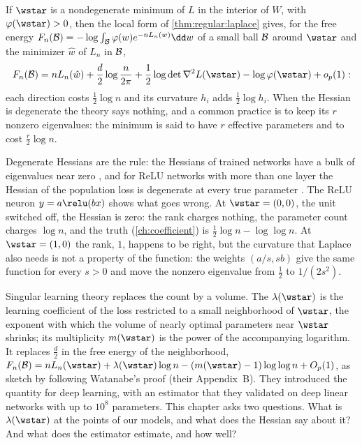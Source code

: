 \begin{refsection}
\begin{regularanswer}
If $\wstar$ is a nondegenerate minimum of $L$ in the interior of $W$, with $\varphi(\wstar)>0$, then the local form of \cref{thm:regular:laplace} gives, for the free energy $F_n(\llcB)=-\log\int_{\llcB}\varphi(w)e^{-nL_n(w)}\dd w$ of a small ball $\mathcal{B}$ around $\wstar$ and the minimizer $\hat w$ of $L_n$ in $\mathcal{B}$,
\[
F_n(\llcB)=nL_n(\hat w)+\frac d2\log\frac n{2\pi}+\frac12\log\det\nabla^2L(\wstar)-\log\varphi(\wstar)+o_p(1):
\]
each direction costs $\tfrac12\log n$ and its curvature $h_i$ adds $\tfrac12\log h_i$. When the Hessian is degenerate the theory says nothing, and a common practice is to keep its $r$ nonzero eigenvalues: the minimum is said to have $r$ effective parameters and to cost $\tfrac r2\log n$.
\end{regularanswer}

Degenerate Hessians are the rule: the Hessians of trained networks have a bulk of eigenvalues near zero \parencite{SagunEtAl2016}, and for ReLU networks with more than one layer the Hessian of the population loss is degenerate at every true parameter \parencite{WeiEtAl2023}. The ReLU neuron $y=a\relu(bx)$ shows what goes wrong. At $\wstar=(0,0)$, the unit switched off, the Hessian is zero: the rank charges nothing, the parameter count charges $\log n$, and the truth (\cref{ch:coefficient}) is $\tfrac12\log n-\log\log n$. At $\wstar=(1,0)$ the rank, $1$, happens to be right, but the curvature that Laplace also needs is not a property of the function: the weights $(a/s,sb)$ give the same function for every $s>0$ and move the nonzero eigenvalue from $\tfrac12$ to $1/(2s^2)$.

Singular learning theory replaces the count by a volume. The  $\lambda(\wstar)$ is the learning coefficient of the loss restricted to a small neighborhood of $\wstar$, the exponent with which the volume of nearly optimal parameters near $\wstar$ shrinks; its multiplicity $m(\wstar)$ is the power of the accompanying logarithm. It replaces $\tfrac d2$ in the free energy of the neighborhood, $F_n(\llcB)=nL_n(\wstar)+\lambda(\wstar)\log n-(m(\wstar)-1)\log\log n+O_p(1)$, as \textcite{LauEtAl2025} sketch by following Watanabe's proof (their Appendix~B). They introduced the quantity for deep learning, with an estimator that they validated on deep linear networks with up to $10^8$ parameters. This chapter asks two questions. What is $\lambda(\wstar)$ at the points of our models, and what does the Hessian say about it? And what does the estimator estimate, and how well?


\end{refsection}
